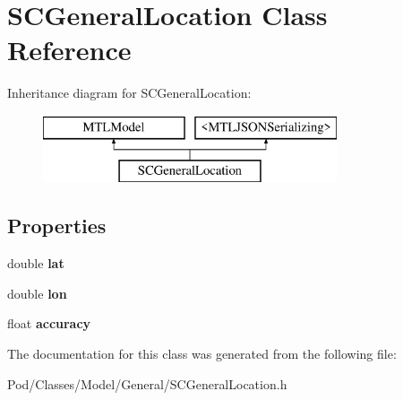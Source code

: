 \hypertarget{interface_s_c_general_location}{}\section{S\+C\+General\+Location Class Reference}
\label{interface_s_c_general_location}
Inheritance diagram for S\+C\+General\+Location\+:\begin{figure}[H]
\begin{center}
\leavevmode
\includegraphics[height=2.000000cm]{interface_s_c_general_location}
\end{center}
\end{figure}
\subsection*{Properties}
\begin{DoxyCompactItemize}
\item 
double {\bfseries lat}\hypertarget{interface_s_c_general_location_afda73e86baeba8394105819e38e63d95}{}\label{interface_s_c_general_location_afda73e86baeba8394105819e38e63d95}

\item 
double {\bfseries lon}\hypertarget{interface_s_c_general_location_a4d5e6b6947d9abc01a4c96f132f2921f}{}\label{interface_s_c_general_location_a4d5e6b6947d9abc01a4c96f132f2921f}

\item 
float {\bfseries accuracy}\hypertarget{interface_s_c_general_location_afc38d437847a871e7b35b6c10e63ca14}{}\label{interface_s_c_general_location_afc38d437847a871e7b35b6c10e63ca14}

\end{DoxyCompactItemize}


The documentation for this class was generated from the following file\+:\begin{DoxyCompactItemize}
\item 
Pod/\+Classes/\+Model/\+General/S\+C\+General\+Location.\+h\end{DoxyCompactItemize}
